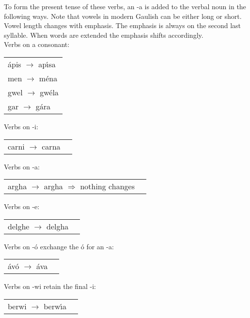 To form the present tense of these verbs, an -a is added to the verbal noun in the following ways. Note that vowels in modern Gaulish can be either long or short. Vowel length changes with emphasis. The emphasis is always on the second last syllable. When words are extended the emphasis shifts accordingly.\\

Verbs on a consonant:
\begin{table}[H]
\begin{tabu}{l}
  \'{a}pis $\rightarrow$ ap\'{\i}sa\\
  men $\rightarrow$ m\'{e}na\\
  gwel $\rightarrow$ gw\'{e}la\\
  gar $\rightarrow$ g\'{a}ra\\
\end{tabu}
\label{examples_verbs_oac}
\end{table}

Verbs on -i:
\begin{table}[H]
\begin{tabu}{ll}
  carni $\rightarrow$ carna
\end{tabu}
\label{examples_verbs_on_i}
\end{table}

Verbs on -a:
\begin{table}[H]
\begin{tabu}{ll}
  argha $\rightarrow$ argha $\Rightarrow$ nothing changes
\end{tabu}
\label{examples_verbs_on_a}
\end{table}

Verbs on -e:
\begin{table}[H]
\begin{tabu}{ll}
  delghe $\rightarrow$ delgha
\end{tabu}
\label{examples_verbs_on_e}
\end{table}

Verbs on -\'{o} exchange the \'{o} for an -a:
\begin{table}[H]
\begin{tabu}{ll}
  \'{a}v\'{o} $\rightarrow$ \'{a}va
\end{tabu}
\label{examples_verbs_on_oo}
\end{table}

Verbs on -wi retain the final -i:
\begin{table}[H]
\begin{tabu}{ll}
  berwi $\rightarrow$ berw\'{\i}a
\end{tabu}
\label{examples_verbs_on_wi}
\end{table}


